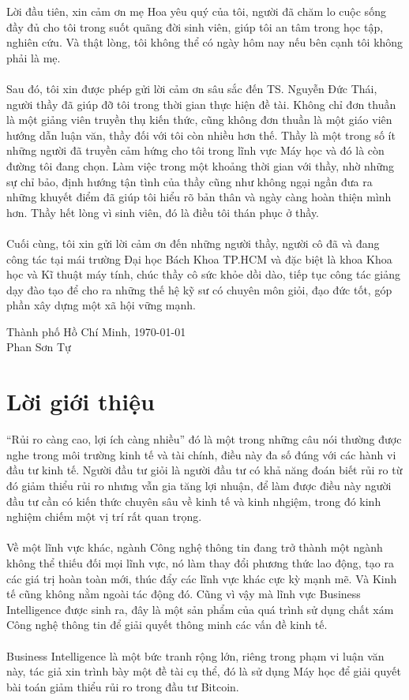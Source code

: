Lời đầu tiên, xin cảm ơn mẹ Hoa yêu quý của tôi, người đã chăm lo cuộc
sống đầy đủ cho tôi trong suốt quãng đời sinh viên, giúp tôi an tâm trong học
tập, nghiên cứu. Và thật lòng, tôi không thể có ngày hôm nay nếu bên 
cạnh tôi không phải là mẹ.\\\\
Sau đó, tôi xin được phép gửi lời cảm ơn sâu sắc đến TS. Nguyễn Đức Thái,
người thầy đã giúp đỡ tôi trong thời gian thực hiện đề tài.
Không chỉ đơn thuần là một giảng viên truyền thụ kiến thức, cũng không đơn thuần
là một giáo viên hướng dẫn luận văn, thầy đối với tôi còn nhiều hơn thế. Thầy là
một trong số ít những người đã truyền cảm hứng cho tôi trong lĩnh vực Máy học 
và đó là còn đường tôi đang chọn. Làm việc trong một khoảng thời gian với thầy, 
nhờ những sự chỉ bảo, định hướng tận tình của thầy cũng như không ngại ngần đưa 
ra những khuyết điểm đã giúp tôi hiểu rõ bản thân và ngày càng hoàn thiện mình 
hơn. Thầy hết lòng vì sinh viên, đó là điều tôi thán phục ở thầy.\\\\
Cuối cùng, tôi xin gửi lời cảm ơn đến những người thầy, người cô đã và đang công 
tác tại mái trường Đại học Bách Khoa TP.HCM và đặc biệt là khoa Khoa 
học và Kĩ thuật máy tính, chúc thầy cô sức khỏe dồi dào, tiếp tục công tác giảng 
dạy đào tạo để cho ra những thế hệ kỹ sư có chuyên môn giỏi, đạo đức tốt, góp 
phần xây dựng một xã hội vững mạnh.
\vspace{2cm}
\begin{flushright}
Thành phố Hồ Chí Minh, \MakeLowercase{\today}\\ 
Phan Sơn Tự\\
\end{flushright}
\pagebreak

\section*{Lời giới thiệu}
\thispagestyle{plain} 
``Rủi ro càng cao, lợi ích càng nhiều'' đó là một trong những câu nói thường
được nghe trong môi trường kinh tế và tài chính, điều này đa số đúng với các hành vi đầu tư
kinh tế. Người đầu tư giỏi là người đầu tư có khả năng đoán biết rủi ro từ đó
giảm thiểu rủi ro nhưng vẫn gia tăng lợi nhuận, để làm được điều này người
đầu tư cần có kiến thức chuyên sâu về kinh tế và kinh nhgiệm, trong đó kinh 
nghiệm chiếm một vị trí rất quan trọng.\\\\
Về một lĩnh vực khác, ngành Công nghệ thông tin đang trở thành một ngành không 
thể thiếu đối mọi lĩnh vực, nó làm thay đổi phương thức lao động, tạo ra các 
giá trị hoàn toàn mới, thúc đẩy các lĩnh vực khác cực kỳ mạnh mẽ. Và Kinh tế 
cũng không nằm ngoài tác động đó. Cũng vì vậy mà lĩnh vực Business Intelligence
được sinh ra, đây là một sản phẩm của quá trình sử dụng chất xám Công nghệ 
thông tin để giải quyết thông minh các vấn đề kinh tế.\\\\
Business Intelligence là một bức tranh rộng lớn, riêng trong phạm vi luận văn 
này, tác giả xin trình bày một đề tài cụ thể, đó là sử dụng Máy học để 
giải quyết bài toán giảm thiểu rủi ro trong đầu tư Bitcoin.
\pagebreak